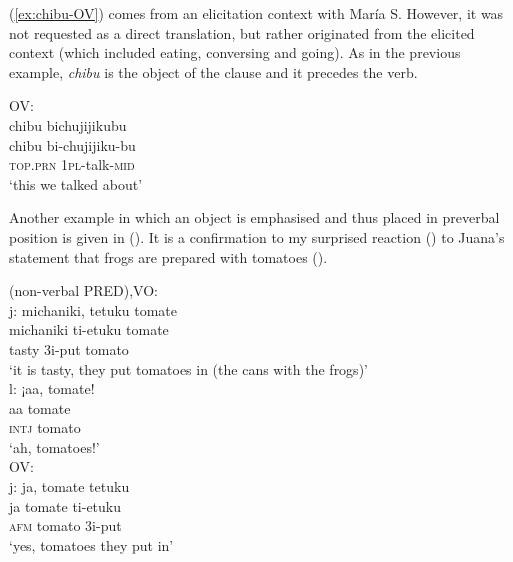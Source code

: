 (\ref{ex:chibu-OV}) comes from an elicitation context with María S. However, it was not requested as a direct translation, but rather originated from the elicited context (which included eating, conversing and going). As in the previous example, \textit{chibu} is the object of the clause and it precedes the verb.

\ea\label{ex:chibu-OV}
\begingl
\glpreamble  \textup{OV:}\\chibu bichujijikubu\\
\gla chibu bi-chujijiku-bu\\
\textsc{top.prn} 1\textsc{pl}-talk-\textsc{mid}\\
\glft ‘this we talked about’
\endgl
\trailingcitation{[rxx-e181020le]}
\xe


Another example in which an object is emphasised and thus placed in preverbal position is given in (). It is a confirmation to my surprised reaction () to Juana’s statement that frogs are prepared with tomatoes (). 

\ea\label{ex:tomato-OV}
  \ea\label{ex:tomato-OV.1}
 \begingl 
\glpreamble  \textup{(non-verbal PRED),VO:}\\\textup{j:} michaniki, tetuku tomate\\
\gla michaniki ti-etuku tomate\\ 
\glb tasty 3i-put tomato\\ 
\glft ‘it is tasty, they put tomatoes in (the cans with the frogs)’\\ 
\endgl
  \ex\label{ex:tomato-OV.2}
 \begingl 
\glpreamble \textup{l:} ¡aa, tomate!\\
\gla aa tomate\\ 
\glb \textsc{intj} tomato\\ 
\glft ‘ah, tomatoes!’\\ 
\endgl
  \ex\label{ex:tomato-OV.3}
 \begingl
\glpreamble  \textup{OV:}\\\textup{j:} ja, tomate tetuku\\
\gla ja tomate ti-etuku\\
\glb \textsc{afm} tomato 3i-put\\
\glft ‘yes, tomatoes they put in’
\endgl
\trailingcitation{[jxx-a120516l-a.468-470]}
\z
\xe


